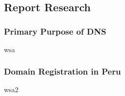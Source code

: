 \subsection{Report Research}

\subsubsection{Primary Purpose of DNS}

wsa

\subsubsection{Domain Registration in Peru}

wsa2